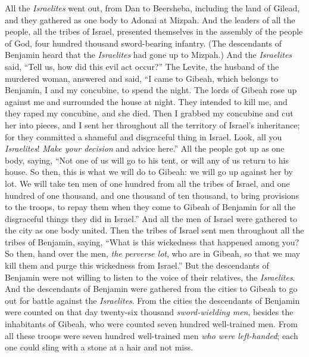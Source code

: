 \begin{biblechapter} %
 All the \textit{Israelites} went out, from Dan to Beersheba, including the land of Gilead, and they gathered as one body to Adonai at Mizpah.
\verse And the leaders of all the people, all the tribes of Israel, presented themselves in the assembly of the people of God, four hundred thousand sword-bearing infantry.
\verse (The descendants of Benjamin heard that the \textit{Israelites} had gone up to Mizpah.) And the \textit{Israelites} said, “Tell us, how did this evil act occur?”
\verse The Levite, the husband of the murdered woman, answered and said, “I came to Gibeah, which belongs to Benjamin, I and my concubine, to spend the night.
\verse The lords of Gibeah rose up against me and surrounded the house at night. They intended to kill me, and they raped my concubine, and she died.
\verse Then I grabbed my concubine and cut her into pieces, and I sent her throughout all the territory of Israel’s inheritance; for they committed a shameful and disgraceful thing in Israel.
\verse Look, all you \textit{Israelites}! \textit{Make your decision} and advice here.”
\verse All the people got up as one body, saying, “Not one of us will go to his tent, or will any of us return to his house.
\verse So then, this is what we will do to Gibeah: we will go up against her by lot.
\verse We will take ten men of one hundred from all the tribes of Israel, and one hundred of one thousand, and one thousand of ten thousand, to bring provisions to the troops, to repay them when they come to Gibeah of Benjamin for all the disgraceful things they did in Israel.”
\verse And all the men of Israel were gathered to the city as one body united.
\verse Then the tribes of Israel sent men throughout all the tribes of Benjamin, saying, “What is this wickedness that happened among you?
\verse So then, hand over the men, \textit{the perverse lot}, who are in Gibeah, so that we may kill them and purge this wickedness from Israel.” But the descendants of Benjamin were not willing to listen to the voice of their relatives, the \textit{Israelites}.
\verse And the descendants of Benjamin were gathered from the cities to Gibeah to go out for battle against the \textit{Israelites}.
\verse From the cities the descendants of Benjamin were counted on that day twenty-six thousand \textit{sword-wielding men}, besides the inhabitants of Gibeah, who were counted seven hundred well-trained men.
\verse From all these troops were seven hundred well-trained men \textit{who were left-handed}; each one could sling with a stone at a hair and not miss.

\end{biblechapter}
